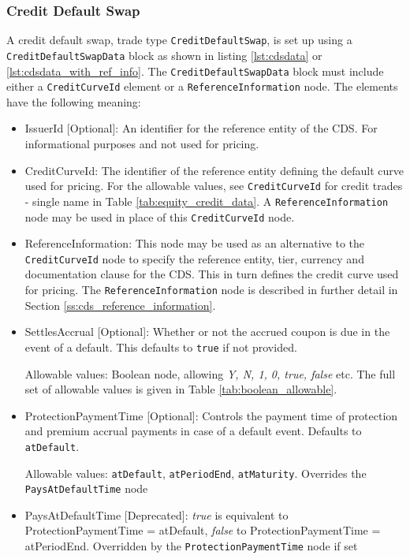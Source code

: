 \subsubsection{Credit Default Swap}

A credit default swap, trade type \lstinline!CreditDefaultSwap!, is set up using a \lstinline!CreditDefaultSwapData! block as shown in listing \ref{lst:cdsdata} or \ref{lst:cdsdata_with_ref_info}. The \lstinline!CreditDefaultSwapData! block must include either a \lstinline!CreditCurveId! element or a \lstinline!ReferenceInformation! node. The elements have the following meaning:

\begin{itemize}
\item IssuerId [Optional]: An identifier for the reference entity of the CDS. For informational purposes and not used for pricing.
\item CreditCurveId: The identifier of the reference entity defining the default curve used for pricing. For the allowable values, see \lstinline!CreditCurveId! for credit trades - single name in Table \ref{tab:equity_credit_data}. A \lstinline!ReferenceInformation! node may be used in place of this \lstinline!CreditCurveId! node.
\item ReferenceInformation: This node may be used as an alternative to the \lstinline!CreditCurveId! node to specify the reference entity, tier, currency and documentation clause for the CDS. This in turn defines the credit curve used for pricing. The \lstinline!ReferenceInformation! node is described in further detail in Section \ref{ss:cds_reference_information}.
\item SettlesAccrual [Optional]: Whether or not the accrued coupon is due in the event of a default. This defaults to \lstinline!true! if not provided.

Allowable values: Boolean node, allowing \emph{Y, N, 1, 0, true, false} etc. The full set of allowable values is given in Table \ref{tab:boolean_allowable}.

\item ProtectionPaymentTime [Optional]: Controls the payment time of protection and premium accrual payments in case of
  a default event. Defaults to \lstinline!atDefault!. 
  
Allowable values: \lstinline!atDefault!, \lstinline!atPeriodEnd!, \lstinline!atMaturity!. Overrides the \lstinline!PaysAtDefaultTime! node
  
\item PaysAtDefaultTime [Deprecated]: \emph{true} is equivalent to ProtectionPaymentTime = atDefault,
  \emph{false} to ProtectionPaymentTime = atPeriodEnd. Overridden by the \lstinline!ProtectionPaymentTime! node if set
  

\end{itemize}
